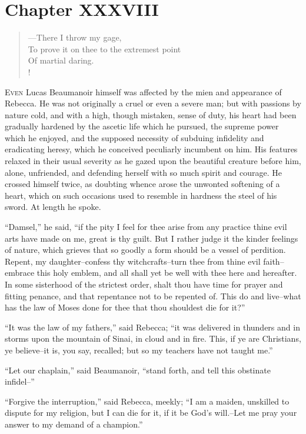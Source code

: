 \chapter{Chapter XXXVIII}

\begin{verse}
---There I throw my gage,\\
To prove it on thee to the extremest point\\
Of martial daring.\\!
\end{verse}

\lettrine{E}{ven} Lucas Beaumanoir himself was affected by the mien
and appearance of
Rebecca. He was not originally a cruel or even a severe man; but with
passions by nature cold, and with a high, though mistaken, sense of
duty, his heart had been gradually hardened by the ascetic life which he
pursued, the supreme power which he enjoyed, and the supposed necessity
of subduing infidelity and eradicating heresy, which he conceived
peculiarly incumbent on him. His features relaxed in their usual
severity as he gazed upon the beautiful creature before him, alone,
unfriended, and defending herself with so much spirit and courage. He
crossed himself twice, as doubting whence arose the unwonted softening
of a heart, which on such occasions used to resemble in hardness the
steel of his sword. At length he spoke.

``Damsel,'' he said, ``if the pity I feel for thee arise from any
practice thine evil arts have made on me, great is thy guilt. But I
rather judge it the kinder feelings of nature, which grieves that so
goodly a form should be a vessel of perdition. Repent, my
daughter--confess thy witchcrafts--turn thee from thine evil
faith--embrace this holy emblem, and all shall yet be well with thee
here and hereafter. In some sisterhood of the strictest order, shalt
thou have time for prayer and fitting penance, and that repentance not
to be repented of. This do and live--what has the law of Moses done for
thee that thou shouldest die for it?''

``It was the law of my fathers,'' said Rebecca; ``it was delivered in
thunders and in storms upon the mountain of Sinai, in cloud and in fire.
This, if ye are Christians, ye believe--it is, you say, recalled; but so
my teachers have not taught me.''

``Let our chaplain,'' said Beaumanoir, ``stand forth, and tell this
obstinate infidel--''

``Forgive the interruption,'' said Rebecca, meekly; ``I am a maiden,
unskilled to dispute for my religion, but I can die for it, if it be
God's will.--Let me pray your answer to my demand of a champion.''

